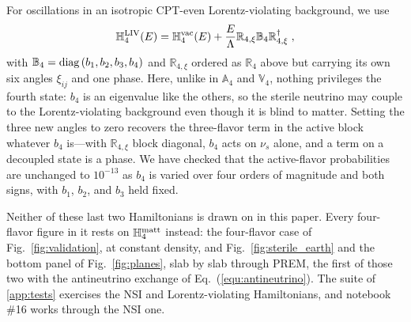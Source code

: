 \documentclass[final,5p,times,twocolumn,sort,compress]{elsarticle}
\newcommand{\eq}{Eq.}
\newcommand{\fig}{Fig.}
\newcommand{\equ}[1]{\eq~(\ref{equ:#1})}
\newcommand{\figu}[1]{\fig~\ref{fig:#1}}
\begin{document}
For oscillations in an isotropic CPT-even Lorentz-violating background, we use
\begin{equation}
 \mathbb{H}_4^{\rm LIV}(E)
 =
 \mathbb{H}_4^{\rm vac}(E) + \frac{E}{\Lambda} \mathbb{R}_{4,\xi} \mathbb{B}_4 \mathbb{R}_{4,\xi}^\dagger \;,
\end{equation}
with $\mathbb{B}_4 = {\rm diag}\left(b_1, b_2, b_3, b_4\right)$ and $\mathbb{R}_{4,\xi}$ ordered as $\mathbb{R}_4$ above but carrying its own six angles $\xi_{ij}$ and one phase.  Here, unlike in $\mathbb{A}_4$ and $\mathbb{V}_4$, nothing privileges the fourth state: $b_4$ is an eigenvalue like the others, so the sterile neutrino may couple to the Lorentz-violating background even though it is blind to matter.  Setting the three new angles to zero recovers the three-flavor term in the active block whatever $b_4$ is---with $\mathbb{R}_{4,\xi}$ block diagonal, $b_4$ acts on $\nu_s$ alone, and a term on a decoupled state is a phase.  We have checked that the active-flavor probabilities are unchanged to $10^{-13}$ as $b_4$ is varied over four orders of magnitude and both signs, with $b_1$, $b_2$, and $b_3$ held fixed.

Neither of these last two Hamiltonians is drawn on in this paper.  Every four-flavor figure in it rests on $\mathbb{H}_4^{\rm matt}$ instead: the four-flavor case of \figu{validation}, at constant density, and \figu{sterile_earth} and the bottom panel of \figu{planes}, slab by slab through PREM, the first of those two with the antineutrino exchange of \equ{antineutrino}.  The suite of \ref{app:tests} exercises the NSI and Lorentz-violating Hamiltonians, and notebook \#16 works through the NSI one.

\newpage
\end{document}
